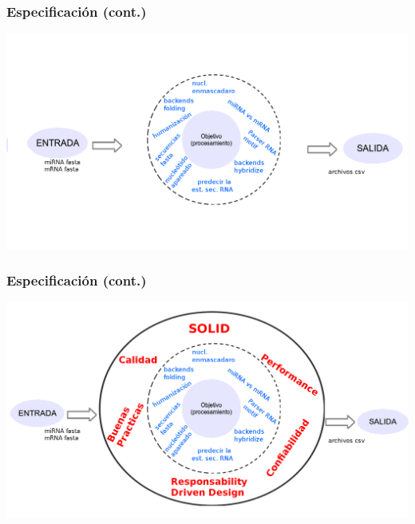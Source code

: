       \begin{frame}\frametitle{\textbf{Especificación (cont.)}}
        \hspace*{-.9cm}  \includegraphics[scale=.2]{images/especificacion2.png}
      \end{frame}  

      \begin{frame}\frametitle{\textbf{Especificación (cont.)}}
        \hspace*{-.5cm} \includegraphics[scale=.2]{images/especificacion3.png}
      \end{frame}  

